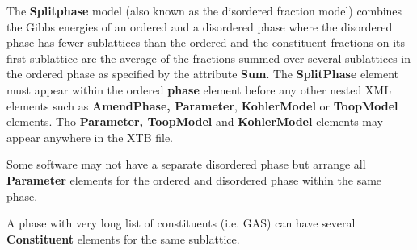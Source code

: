 \documentclass{article}
\begin{document}
The {\bf Splitphase} model (also known as the disordered fraction
model) combines the Gibbs energies of an ordered and a disordered
phase where the disordered phase has fewer sublattices than the
ordered and the constituent fractions on its first sublattice are the
average of the fractions summed over several sublattices in the
ordered phase as specified by the attribute {\bf Sum}.  The {\bf
  SplitPhase} element must appear within the ordered {\bf phase}
element before any other nested XML elements such as {\bf AmendPhase,
  Parameter}, {\bf KohlerModel} or {\bf ToopModel} elements.  Tho {\bf
  Parameter, ToopModel} and {\bf KohlerModel} elements may appear anywhere in
the XTB file.

Some software may not have a separate disordered phase but arrange all
{\bf Parameter} elements for the ordered and disordered phase within
the same phase.

A phase with very long list of constituents (i.e. GAS) can have
several {\bf Constituent} elements for the same sublattice.
\end{document}
